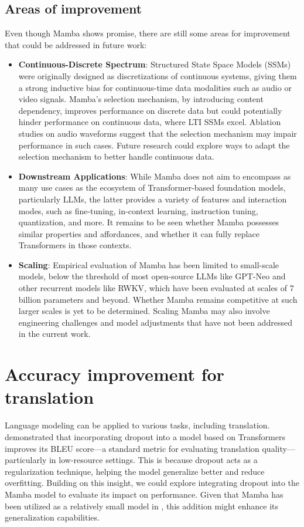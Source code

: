 \documentclass[onecolumn]{IEEEtran}
\begin{document}
\subsection{Areas of improvement}
Even though Mamba shows promise, there are still some areas for improvement that could be addressed in future work:
\begin{itemize}
    \item \textbf{Continuous-Discrete Spectrum}: Structured State Space Models (SSMs) were originally designed as discretizations of continuous systems, giving them a strong inductive bias for continuous-time data modalities such as audio or video signals. Mamba's selection mechanism, by introducing content dependency, improves performance on discrete data but could potentially hinder performance on continuous data, where LTI SSMs excel. Ablation studies on audio waveforms suggest that the selection mechanism may impair performance in such cases. Future research could explore ways to adapt the selection mechanism to better handle continuous data.
    \item \textbf{Downstream Applications}: While Mamba does not aim to encompass as many use cases as the ecosystem of Transformer-based foundation models, particularly LLMs, the latter provides a variety of features and interaction modes, such as fine-tuning, in-context learning, instruction tuning, quantization, and more. It remains to be seen whether Mamba possesses similar properties and affordances, and whether it can fully replace Transformers in those contexts.
    \item \textbf{Scaling}: Empirical evaluation of Mamba has been limited to small-scale models, below the threshold of most open-source LLMs like GPT-Neo and other recurrent models like RWKV, which have been evaluated at scales of 7 billion parameters and beyond. Whether Mamba remains competitive at such larger scales is yet to be determined. Scaling Mamba may also involve engineering challenges and model adjustments that have not been addressed in the current work.
\end{itemize}

\section{Accuracy improvement for translation}
Language modeling can be applied to various tasks, including translation. \cite{escolano2024residual} demonstrated that incorporating dropout into a model based on Transformers improves its BLEU score—a standard metric for evaluating translation quality—particularly in low-resource settings. This is because dropout acts as a regularization technique, helping the model generalize better and reduce overfitting. Building on this insight, we could explore integrating dropout into the Mamba model to evaluate its impact on performance. Given that Mamba has been utilized as a relatively small model in \cite{gu2024mambalineartimesequencemodeling}, this addition might enhance its generalization capabilities.
\end{document}

